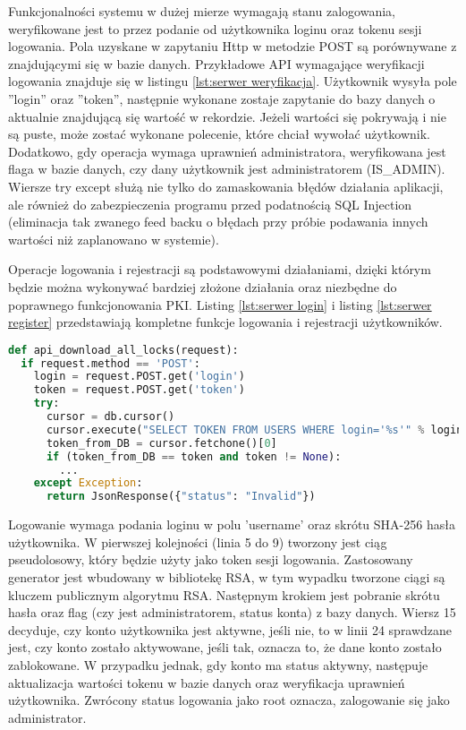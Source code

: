 	Funkcjonalności systemu w  dużej mierze wymagają stanu zalogowania, weryfikowane jest to przez podanie od użytkownika loginu oraz tokenu sesji logowania. Pola uzyskane w zapytaniu Http w metodzie POST są porównywane z znajdującymi się w bazie danych. Przykładowe API wymagające weryfikacji logowania znajduje się w listingu \ref{lst:serwer weryfikacja}. Użytkownik wysyła pole ''login'' oraz ''token'', następnie wykonane zostaje zapytanie do bazy danych o aktualnie znajdującą się wartość w rekordzie. Jeżeli wartości się pokrywają i nie są puste, może zostać wykonane polecenie, które chciał wywołać użytkownik. Dodatkowo, gdy operacja wymaga uprawnień administratora, weryfikowana jest flaga w bazie danych, czy dany użytkownik jest administratorem (IS\_ADMIN). Wiersze try except służą nie tylko do zamaskowania błędów działania aplikacji, ale również do zabezpieczenia programu przed podatnością SQL Injection (eliminacja tak zwanego feed backu o błędach przy próbie podawania innych wartości niż zaplanowano w systemie).
	
	Operacje logowania i rejestracji są podstawowymi działaniami, dzięki którym będzie można wykonywać bardziej złożone działania oraz niezbędne do poprawnego funkcjonowania PKI. Listing \ref{lst:serwer login} i listing \ref{lst:serwer register} przedstawiają kompletne funkcje logowania i rejestracji użytkowników. 
\newpage	
	{\footnotesize 
	\begin{lstlisting}[caption={Przykładowe API weryfikujące stan logowania}, label={lst:serwer weryfikacja}, language=Python]
def api_download_all_locks(request):
  if request.method == 'POST':
    login = request.POST.get('login')
    token = request.POST.get('token')
    try:
      cursor = db.cursor()
      cursor.execute("SELECT TOKEN FROM USERS WHERE login='%s'" % login)
      token_from_DB = cursor.fetchone()[0]
      if (token_from_DB == token and token != None):
        ...
    except Exception:
      return JsonResponse({"status": "Invalid"})
	\end{lstlisting}}

	Logowanie wymaga podania loginu w polu 'username' oraz skrótu SHA-256 hasła użytkownika. W pierwszej kolejności (linia 5 do 9) tworzony jest ciąg pseudolosowy, który będzie użyty jako token sesji logowania. Zastosowany generator jest wbudowany w bibliotekę RSA, w tym wypadku tworzone ciągi są kluczem publicznym algorytmu RSA. Następnym krokiem jest pobranie skrótu hasła oraz flag (czy jest administratorem, status konta) z bazy danych. Wiersz 15 decyduje, czy konto użytkownika jest aktywne, jeśli nie, to w linii 24 sprawdzane jest, czy konto zostało aktywowane, jeśli tak, oznacza to, że dane konto zostało zablokowane. W przypadku jednak, gdy konto ma status aktywny, następuje aktualizacja wartości tokenu w bazie danych oraz weryfikacja uprawnień użytkownika. Zwrócony status logowania jako root oznacza, zalogowanie się jako administrator.
	
